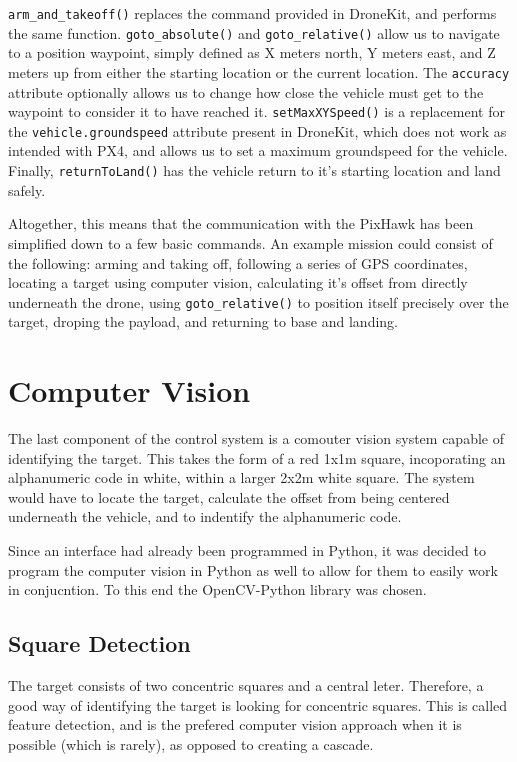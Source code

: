 \documentclass[10pt]{article}
\begin{document}
\lstinline|arm_and_takeoff()| replaces the command provided in DroneKit, and performs the same function. \lstinline|goto_absolute()| and \lstinline|goto_relative()| allow us to navigate to a position waypoint, simply defined as X meters north, Y meters east, and Z meters up from either the starting location or the current location. The \lstinline|accuracy| attribute optionally allows us to change how close the vehicle must get to the waypoint to consider it to have reached it. \lstinline|setMaxXYSpeed()| is a replacement for the \lstinline|vehicle.groundspeed| attribute present in DroneKit, which does not work as intended with PX4, and allows us to set a maximum groundspeed for the vehicle. Finally, \lstinline|returnToLand()| has the vehicle return to it's starting location and land safely.

Altogether, this means that the communication with the PixHawk has been simplified down to a few basic commands. An example mission could consist of the following: arming and taking off, following a series of GPS coordinates, locating a target using computer vision, calculating it's offset from directly underneath the drone, using \lstinline|goto_relative()| to position itself precisely over the target, droping the payload, and returning to base and landing.


\section{Computer Vision}
The last component of the control system is a comouter vision system capable of identifying the target. This takes the form of a red 1x1m square, incoporating an alphanumeric code in white, within a larger 2x2m white square\cite{IMechE_rules}. The system would have to locate the target, calculate the offset from being centered underneath the vehicle, and to indentify the alphanumeric code.

Since an interface had already been programmed in Python, it was decided to program the computer vision in Python as well to allow for them to easily work in conjucntion. To this end the OpenCV-Python library was chosen.

\subsection{Square Detection}
The target consists of two concentric squares and a central leter. Therefore, a good way of identifying the target is looking for concentric squares. This is called feature detection, and is the prefered computer vision approach when it is possible (which is rarely), as opposed to creating a cascade.
\end{document}

